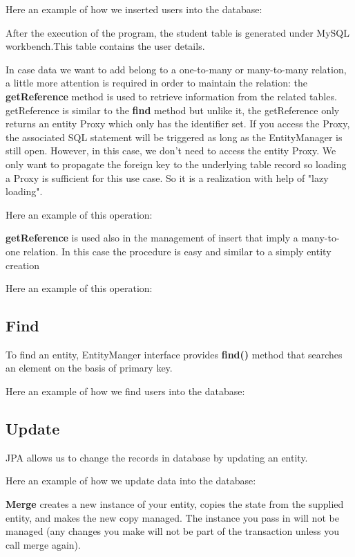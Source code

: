 \documentclass[a4paper]{article}
\begin{document}
Here an example of how we inserted users into the database:


After the execution of the program, the student table is generated under MySQL workbench.This table contains the user details.

In case data we want to add belong to a one-to-many or many-to-many relation, a little more attention is required in order to maintain the relation: the \textbf{getReference} method is used to retrieve information from the related tables. getReference is similar to the \textbf{find} method but unlike it, the getReference only returns an entity Proxy which only has the identifier set. If you access the Proxy, the associated SQL statement will be triggered as long as the EntityManager is still open. However, in this case, we don’t need to access the entity Proxy. We only want to propagate the foreign key to the underlying table record so loading a Proxy is sufficient for this use case. So it is a realization with help of "lazy loading".

Here an example of this operation:


 \textbf{getReference} is used also in the management of insert that imply a many-to-one relation. In this case the procedure is easy and similar to a simply entity creation

Here an example of this operation:


\subsection{Find}
To find an entity, EntityManger interface provides \textbf{find()} method that searches an element on the basis of primary key.

Here an example of how we find users into the database:


\subsection{Update}
JPA allows us to change the records in database by updating an entity.

Here an example of how we update data into the database:


\textbf{Merge} creates a new instance of your entity, copies the state from the supplied entity, and makes the new copy managed. The instance you pass in will not be managed (any changes you make will not be part of the transaction unless you call merge again).
\end{document}
